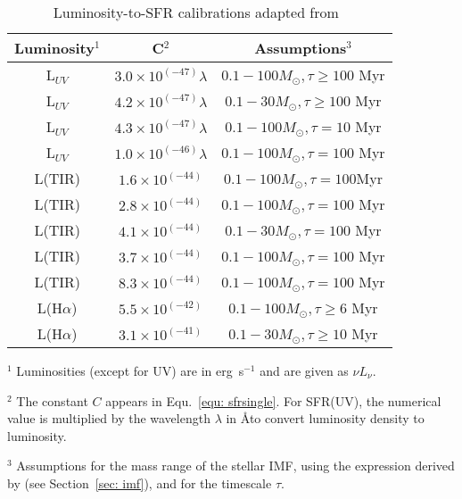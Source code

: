 \begin{table}
\caption{Luminosity-to-SFR calibrations adapted from~\cite{Calzetti13}}
\label{table1}
\begin{center}
\begin{tabular}{ c c c }
\hline\hline
Luminosity$^1$ & C$^2$ & Assumptions$^3$\\
\hline
L$_{UV}$ & $3.0 \times 10^{(-47)} \lambda$ &$0.1 -100 M_{\odot}, \tau \ge 100$ Myr \\
L$_{UV}$ & $4.2 \times 10^{(-47)} \lambda$ &$0.1 -30 M_{\odot}, \tau \ge 100$ Myr \\
L$_{UV}$ & $4.3 \times 10^{(-47)}\lambda$ &$0.1 -100 M_{\odot}, \tau = 10$ Myr \\
L$_{UV}$ & $1.0 \times 10^{(-46)}\lambda$ &$0.1 -100 M_{\odot}, \tau = 100$ Myr \\
L(TIR) & $1.6 \times 10^{(-44)}$ &$0.1 -100 M_{\odot}, \tau = 100$Myr \\
L(TIR) & $2.8 \times 10^{(-44)}$ &$0.1 -100 M_{\odot}, \tau = 100$ Myr \\
L(TIR) & $4.1 \times 10^{(-44)}$ &$0.1 -30 M_{\odot}, \tau = 100$ Myr \\
L(TIR) & $3.7 \times 10^{(-44)}$ &$0.1 -100 M_{\odot}, \tau = 100$ Myr \\
L(TIR) & $8.3 \times 10^{(-44)}$ &$0.1 -100 M_{\odot}, \tau = 100$ Myr \\
L(H${\alpha}$) & $5.5 \times 10^{(-42)}$&$0.1 -100 M_{\odot},  \tau \ge 6$ Myr \\
L(H${\alpha}$) & $3.1 \times 10^{(-41)}$&$0.1 -30 M_{\odot},  \tau \ge 10$ Myr \\
\hline
\end{tabular}
\end{center}
\begin{tablenotes}
\item $^1$ Luminosities (except for UV) are in erg~s$^{-1}$ and are given as $\nu L_{\nu}$.
\item $^2$ The constant $C$ appears in Equ.~\ref{equ: sfrsingle}. For SFR(UV), the numerical value is multiplied by the wavelength $\lambda$ in \AA to convert luminosity density to luminosity. 
\item $^3$ Assumptions for the mass range of the stellar IMF, using the expression derived by \cite{Kroupa01} (see Section~\ref{sec: imf}), and for the timescale $\tau$.
\end{tablenotes}
\end{table}


